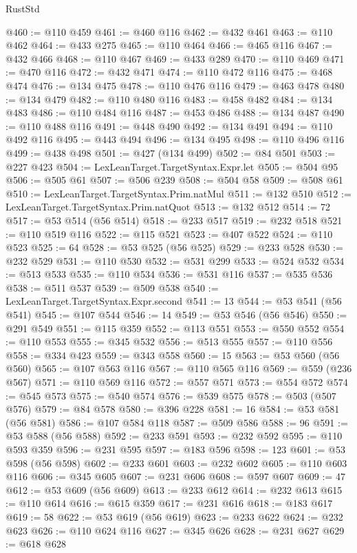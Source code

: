 \begin{lexlean}{RustStd}
\begin{coremodule}
@460 := @110 @459
@461 := @460 @116
@462 := @432 @461
@463 := @110 @462
@464 := @433 @275
@465 := @110 @464
@466 := @465 @116
@467 := @432 @466
@468 := @110 @467
@469 := @433 @289
@470 := @110 @469
@471 := @470 @116
@472 := @432 @471
@474 := @110 @472 @116
@475 := @468 @474
@476 := @134 @475
@478 := @110 @476 @116
@479 := @463 @478
@480 := @134 @479
@482 := @110 @480 @116
@483 := @458 @482
@484 := @134 @483
@486 := @110 @484 @116
@487 := @453 @486
@488 := @134 @487
@490 := @110 @488 @116
@491 := @448 @490
@492 := @134 @491
@494 := @110 @492 @116
@495 := @443 @494
@496 := @134 @495
@498 := @110 @496 @116
@499 := @438 @498
@501 := @427 (@134 @499)
@502 := @84 @501
@503 := @227 @423
@504 := LexLeanTarget.TargetSyntax.Expr.let
@505 := @504 @95
@506 := @505 @61
@507 := @506 @239
@508 := @504 @58
@509 := @508 @61
@510 := LexLeanTarget.TargetSyntax.Prim.natMul
@511 := @132 @510
@512 := LexLeanTarget.TargetSyntax.Prim.natQuot
@513 := @132 @512
@514 := 72
@517 := @53 @514 (@56 @514)
@518 := @233 @517
@519 := @232 @518
@521 := @110 @519 @116
@522 := @115 @521
@523 := @407 @522
@524 := @110 @523
@525 := 64
@528 := @53 @525 (@56 @525)
@529 := @233 @528
@530 := @232 @529
@531 := @110 @530
@532 := @531 @299
@533 := @524 @532
@534 := @513 @533
@535 := @110 @534
@536 := @531 @116
@537 := @535 @536
@538 := @511 @537
@539 := @509 @538
@540 := LexLeanTarget.TargetSyntax.Expr.second
@541 := 13
@544 := @53 @541 (@56 @541)
@545 := @107 @544
@546 := 14
@549 := @53 @546 (@56 @546)
@550 := @291 @549
@551 := @115 @359
@552 := @113 @551
@553 := @550 @552
@554 := @110 @553
@555 := @345 @532
@556 := @513 @555
@557 := @110 @556
@558 := @334 @423
@559 := @343 @558
@560 := 15
@563 := @53 @560 (@56 @560)
@565 := @107 @563 @116
@567 := @110 @565 @116
@569 := @559 (@236 @567)
@571 := @110 @569 @116
@572 := @557 @571
@573 := @554 @572
@574 := @545 @573
@575 := @540 @574
@576 := @539 @575
@578 := @503 (@507 @576)
@579 := @84 @578
@580 := @396 @228
@581 := 16
@584 := @53 @581 (@56 @581)
@586 := @107 @584 @118
@587 := @509 @586
@588 := 96
@591 := @53 @588 (@56 @588)
@592 := @233 @591
@593 := @232 @592
@595 := @110 @593 @359
@596 := @231 @595
@597 := @183 @596
@598 := 123
@601 := @53 @598 (@56 @598)
@602 := @233 @601
@603 := @232 @602
@605 := @110 @603 @116
@606 := @345 @605
@607 := @231 @606
@608 := @597 @607
@609 := 47
@612 := @53 @609 (@56 @609)
@613 := @233 @612
@614 := @232 @613
@615 := @110 @614
@616 := @615 @359
@617 := @231 @616
@618 := @183 @617
@619 := 58
@622 := @53 @619 (@56 @619)
@623 := @233 @622
@624 := @232 @623
@626 := @110 @624 @116
@627 := @345 @626
@628 := @231 @627
@629 := @618 @628

\end{coremodule}
\end{lexlean}
